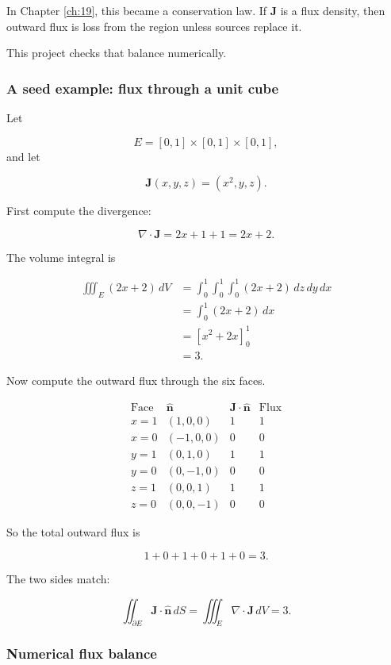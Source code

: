 In Chapter \ref{ch:19}, this became a conservation law.  If \(\mathbf J\) is a flux
density, then outward flux is loss from the region unless sources replace it.

This project checks that balance numerically.

\subsubsection*{A seed example: flux through a unit cube}

Let

\[
    E=[0,1]\times[0,1]\times[0,1],
\]
and let

\[
    \mathbf J(x,y,z)=(x^2,y,z).
\]

First compute the divergence:

\[
    \nabla\cdot\mathbf J
    =
    2x+1+1
    =
    2x+2.
\]

The volume integral is

\[
\begin{aligned}
\iiint_E(2x+2)\,dV
&=
\int_0^1\int_0^1\int_0^1(2x+2)\,dz\,dy\,dx\\
&=
\int_0^1(2x+2)\,dx\\
&=
\left[x^2+2x\right]_0^1\\
&=
3.
\end{aligned}
\]

Now compute the outward flux through the six faces.

\[
\begin{array}{c|c|c|c}
\text{Face} & \widehat{\mathbf n} & \mathbf J\cdot\widehat{\mathbf n}
& \text{Flux} \\ \hline
x=1 & (1,0,0) & 1 & 1\\
x=0 & (-1,0,0) & 0 & 0\\
y=1 & (0,1,0) & 1 & 1\\
y=0 & (0,-1,0) & 0 & 0\\
z=1 & (0,0,1) & 1 & 1\\
z=0 & (0,0,-1) & 0 & 0
\end{array}
\]

So the total outward flux is

\[
    1+0+1+0+1+0=3.
\]

The two sides match:

\[
\boxed{
    \iint_{\partial E}\mathbf J\cdot\widehat{\mathbf n}\,dS
    =
    \iiint_E\nabla\cdot\mathbf J\,dV
    =
    3.
}
\]

\subsubsection*{Numerical flux balance}

